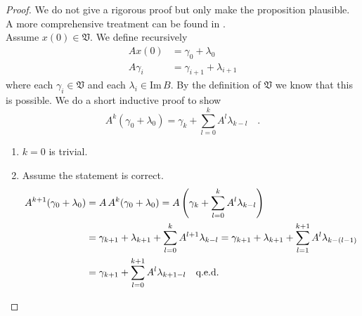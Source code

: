 \begin{proof} We do not give a rigorous proof but only make the proposition plausible. A 
	more comprehensive treatment can be found in \cite{BergerIlchmann}.\\
	Assume $x(0)\in\mathfrak{V}$. We define recursively
	\begin{align*}
	A x(0) &= \gamma_0 + \lambda_0 \\
	A\gamma_{i} &= \gamma_{i+1} + \lambda_{i+1}
	\end{align*}
	where each $\gamma_i\in\mathfrak{V}$ and each $\lambda_i\in\text{Im}\, B$. By the 
	definition of $\mathfrak{V}$ we know that this is possible.
	We do a short inductive proof to show
	\begin{equation}
	A^k (\gamma_0+\lambda_0) = \gamma_k + \sum\limits_{l=0}^k A^l \lambda_{k-l} \quad .
	\end{equation}		
	\begin{enumerate}
		\item $k=0$ is trivial.
		\item Assume the statement is correct.
		\begin{align*}
		A^{k+1}(\gamma_0+\lambda_0) &= A \,A^k(\gamma_0+\lambda_0)
		= A \left(\gamma_k +\sum\limits_{l=0}^k A^l\lambda_{k-l} \right) 
		\\
		&= \gamma_{k+1} + \lambda_{k+1} + \sum\limits_{l=0}^k A^{l+1}\lambda_{k-l} 
		= \gamma_{k+1} +\lambda_{k+1} + \sum\limits_{l=1}^{k+1} A^{l} 
		\lambda_{k-(l-1)} \\
		&= \gamma_{k+1} + \sum\limits_{l=0}^{k+1} A^l \lambda_{k+1-l}
		\quad \text{q.e.d.} \quad
		\end{align*}
	\end{enumerate}


\end{proof}
